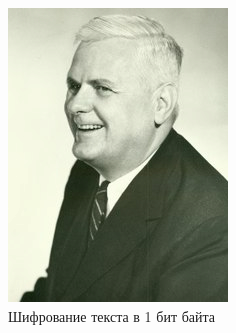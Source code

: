 \documentclass[10pt,a4paper,final]{article} %
\begin{document}
\begin{figure}[h!]
\begin{minipage}{0.3\textwidth}
		\includegraphics[width=\linewidth]{img/Haskell_1}
		\caption{Шифрование текста в 1 бит байта}
	\end{minipage}
	\hspace{0.02\textwidth}
	\begin{minipage}{0.3\textwidth}
		\centering

\end{minipage}
\end{figure}
\end{document}
